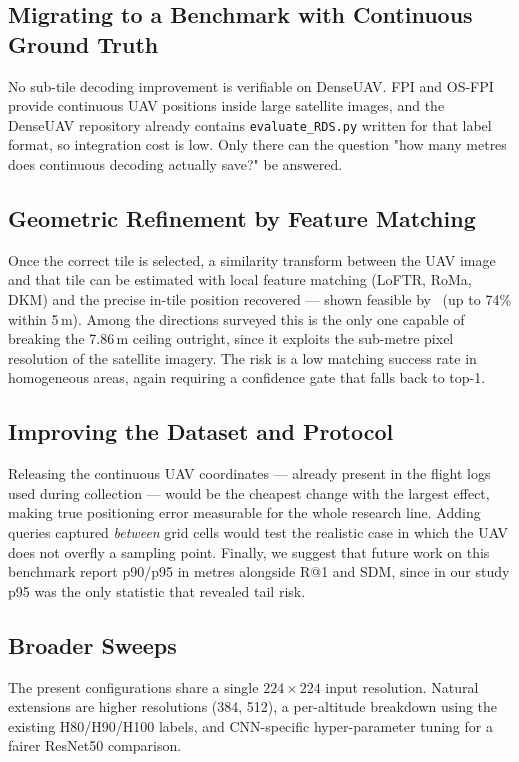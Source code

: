 \documentclass[journal]{IEEEtran}
\begin{document}
\subsection{Migrating to a Benchmark with Continuous Ground Truth}
No sub-tile decoding improvement is verifiable on DenseUAV. FPI and OS-FPI provide
continuous UAV positions inside large satellite images, and the DenseUAV repository already
contains \texttt{evaluate\_RDS.py} written for that label format, so integration cost is
low. Only there can the question "how many metres does continuous decoding actually save?"
be answered.

\subsection{Geometric Refinement by Feature Matching}
Once the correct tile is selected, a similarity transform between the UAV image and that
tile can be estimated with local feature matching (LoFTR, RoMa, DKM) and the precise
in-tile position recovered --- shown feasible by~\cite{camp2025} (up to 74\% within 5\,m).
Among the directions surveyed this is the only one capable of breaking the 7.86\,m ceiling
outright, since it exploits the sub-metre pixel resolution of the satellite imagery. The
risk is a low matching success rate in homogeneous areas, again requiring a confidence gate
that falls back to top-1.

\subsection{Improving the Dataset and Protocol}
Releasing the continuous UAV coordinates --- already present in the flight logs used during
collection --- would be the cheapest change with the largest effect, making true positioning
error measurable for the whole research line. Adding queries captured \emph{between} grid
cells would test the realistic case in which the UAV does not overfly a sampling point.
Finally, we suggest that future work on this benchmark report p90/p95 in metres alongside
R@1 and SDM, since in our study p95 was the only statistic that revealed tail risk.

\subsection{Broader Sweeps}
The present configurations share a single $224 \times 224$ input resolution. Natural
extensions are higher resolutions (384, 512), a per-altitude breakdown using the existing
H80/H90/H100 labels, and CNN-specific hyper-parameter tuning for a fairer ResNet50
comparison.
\end{document}
